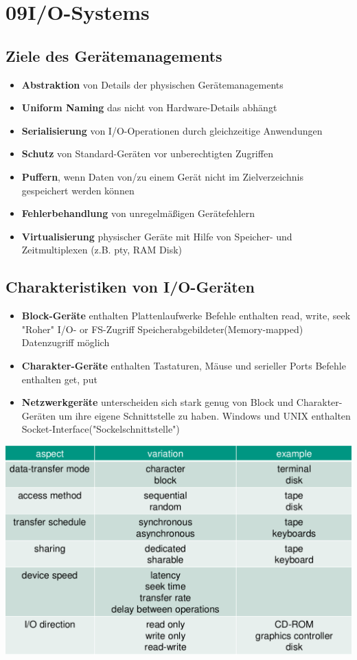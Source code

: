 \documentclass[a4paper]{scrreprt}
\begin{document}
\chapter{09I/O-Systems}

\section{Ziele des Gerätemanagements}
\begin{itemize}
	\item \textbf{Abstraktion} von Details der physischen Gerätemanagements
	\item \textbf{Uniform Naming} das nicht von Hardware-Details abhängt
	\item \textbf{Serialisierung} von I/O-Operationen durch gleichzeitige Anwendungen
	\item \textbf{Schutz} von Standard-Geräten vor unberechtigten Zugriffen 
	\item \textbf{Puffern}, wenn Daten von/zu einem Gerät nicht im Zielverzeichnis gespeichert werden können 
	\item \textbf{Fehlerbehandlung} von unregelmäßigen Gerätefehlern
	\item \textbf{Virtualisierung} physischer Geräte mit Hilfe von Speicher- und Zeitmultiplexen (z.B. pty, RAM Disk)
\end{itemize}

\section{Charakteristiken von I/O-Geräten}
\begin{itemize}
	\item \textbf{Block-Geräte} enthalten Plattenlaufwerke
	\subitem Befehle enthalten read, write, seek
	\subitem "Roher" I/O- or FS-Zugriff
	\subitem Speicherabgebildeter(Memory-mapped) Datenzugriff möglich
	\item \textbf{Charakter-Geräte} enthalten Tastaturen, Mäuse und serieller Ports
	\subitem Befehle enthalten get, put
	\item \textbf{Netzwerkgeräte} unterscheiden sich stark genug von Block und Charakter-Geräten um ihre eigene Schnittstelle  zu haben.
	\subitem Windows und UNIX enthalten Socket-Interface("Sockelschnittstelle")
\end{itemize}
\includegraphics[scale=0.6]{graphics/chapter9_1.png}
\end{document}
